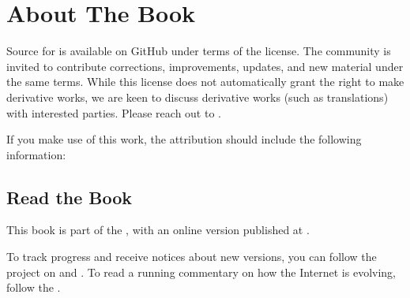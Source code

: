 \documentclass[a4paper,11pt,english]{sphinxmanual}
\begin{document}
\chapter{About The Book}
\label{\detokenize{README:about-the-book}}\label{\detokenize{README::doc}}
\sphinxAtStartPar
Source for  is available on
GitHub under
terms of the  license. The
community is invited to contribute corrections, improvements, updates,
and new material under the same terms. While this license does not
automatically grant the right to make derivative works, we are keen to
discuss derivative works (such as translations) with interested
parties. Please reach out to .

\sphinxAtStartPar
If you make use of this work, the attribution should include the
following information:

\begin{DUlineblock}{0em}
\item[] 
\item[] 
\item[]  
\item[]  
\end{DUlineblock}


\section{Read the Book}
\label{\detokenize{README:read-the-book}}
\sphinxAtStartPar
This book is part of the , with an online version published at
.

\sphinxAtStartPar
To track progress and receive notices about new versions, you can follow
the project on
and . To read a running
commentary on how the Internet is evolving, follow the .
\end{document}
